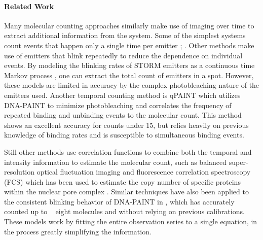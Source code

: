\paragraph{Related Work}

Many molecular counting approaches similarly
  make use of imaging over time to extract additional information from the
  system. 
Some of the simplest systems count events that happen only a single time per emitter \cite{Ulbrich_subunit_2007}; \cite{gunzenhauser_quantitative_2012}.
Other methods make use of emitters that blink repeatedly to reduce the
dependence on individual events.
%
  By modeling the blinking rates of STORM emitters as a continuous time
  Markov process \cite{patel_blinking_2021, rollins_stochastic_2015}, one can extract the total count of emitters
  in a spot. However, these models are limited in accuracy by the complex
  photobleaching nature of the emitters used. Another temporal counting method is
  qPAINT \cite{jungmann_quantitative_2016} which utilizes DNA-PAINT to minimize photobleaching and
  correlates the frequency of repeated binding and unbinding events to the
  molecular count. This method shows an excellent accuracy for counts under 15,
  but relies heavily on previous knowledge of binding rates and is
  susceptible to simultaneous binding events.

%
  Still other methods use correlation functions to combine both the temporal and
  intensity information to estimate the molecular count, such as balanced
  super-resolution optical fluctuation imaging \cite{geissbuehler_mapping_2012} and fluorescence
  correlation spectroscopy (FCS) which has been used to estimate the copy
  number of specific proteins within the nuclear pore complex
  \cite{otsuka_quantitative_2023}. Similar techniques have also been applied to the
  consistent blinking behavior of DNA-PAINT in \lbfcs \cite{stein_calibration-free_2021}, which has
  accurately counted up to ~ eight molecules and without relying on previous
  calibrations. These models work by fitting the entire observation series to a
  single equation, in the process greatly simplifying the information. 
